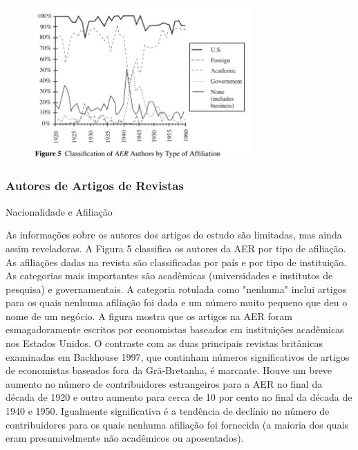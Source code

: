 \documentclass[12pt]{article}
\begin{document}
\begin{figure}[H]
    \centering
    \includegraphics[width=0.75\textwidth]{4º Período/História do Pensamento Econômico/Tradução HPE/Tradução Tópico 7.2/figure 5.png}
    \end{figure}

\subsubsection{\textbf{Autores de Artigos de Revistas}}
Nacionalidade e Afiliação

As informações sobre os autores dos artigos do estudo são limitadas, mas ainda assim reveladoras. A Figura 5 classifica os autores da AER por tipo de afiliação. As afiliações dadas na revista são classificadas por país e por tipo de instituição. As categorias mais importantes são acadêmicas (universidades e institutos de pesquisa) e governamentais. A categoria rotulada como "nenhuma" inclui artigos para os quais nenhuma afiliação foi dada e um número muito pequeno que deu o nome de um negócio. A figura mostra que os artigos na AER foram esmagadoramente escritos por economistas baseados em instituições acadêmicas nos Estados Unidos. O contraste com as duas principais revistas britânicas examinadas em Backhouse 1997, que continham números significativos de artigos de economistas baseados fora da Grã-Bretanha, é marcante. Houve um breve aumento no número de contribuidores estrangeiros para a AER no final da década de 1920 e outro aumento para cerca de 10 por cento no final da década de 1940 e 1950. Igualmente significativa é a tendência de declínio no número de contribuidores para os quais nenhuma afiliação foi fornecida (a maioria dos quais eram presumivelmente não acadêmicos ou aposentados).
\end{document}
